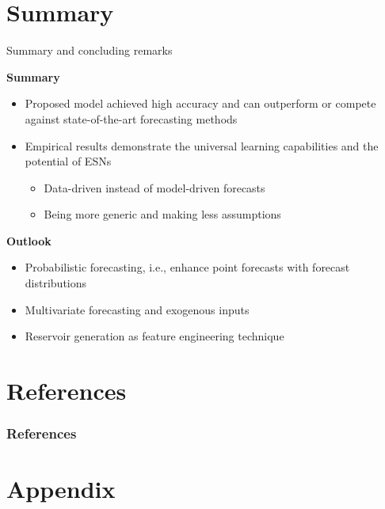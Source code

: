 \documentclass[aspectratio=169]{beamer}
\begin{document}
\section{Summary}


\begin{frame}[t]{Summary and concluding remarks}
    \begin{minipage}[t]{0.5\textwidth}
        \vspace{0pt}
        \textbf{Summary}
        \begin{itemize}
            \item Proposed model achieved high accuracy and can outperform or compete against state-of-the-art forecasting methods
            \item Empirical results demonstrate the universal learning capabilities and the potential of ESNs
            \begin{itemize}
            	\item Data-driven instead of model-driven forecasts
            	\item Being more generic and making less assumptions
            \end{itemize}
        \end{itemize}
    \end{minipage}%
    \hfill
    \begin{minipage}[t]{0.5\textwidth}
        \vspace{0pt}
        \textbf{Outlook}
        \begin{itemize}
        	\item Probabilistic forecasting, i.e., enhance point forecasts with forecast distributions
        	\item Multivariate forecasting and exogenous inputs
        	\item Reservoir generation as feature engineering technique
        \end{itemize}
    \end{minipage}
\end{frame}


\section{References}

\begin{frame}[allowframebreaks]
    \frametitle{References}
    \nocite{*}
    \printbibliography[heading=none]
\end{frame}

\section{Appendix}
\end{document}
